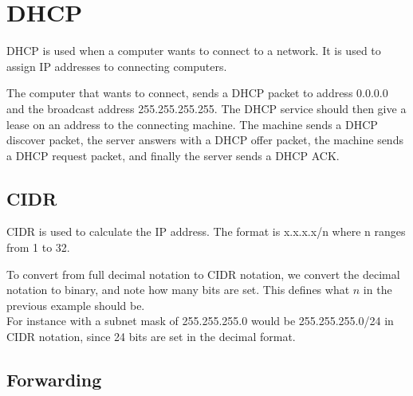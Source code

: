 \section{DHCP}
DHCP is used when a computer wants to connect to a network. It is used
to assign IP addresses to connecting computers.

The computer that wants to connect, sends a DHCP packet to address
0.0.0.0 and the broadcast address 255.255.255.255. The DHCP service
should then give a lease on an address to the connecting
machine. The machine sends a DHCP discover packet, the server answers
with a DHCP offer packet, the machine sends a DHCP request packet, and
finally the server sends a DHCP ACK.

\subsection{CIDR}
CIDR is used to calculate the IP address. The format is x.x.x.x/n
where n ranges from 1 to 32.

To convert from full decimal notation to CIDR notation, we convert the
decimal notation to binary, and note how many bits are set. This
defines what $n$ in the previous example should be.\\
For instance with a subnet mask of 255.255.255.0 would be
255.255.255.0/24 in CIDR notation, since 24 bits are set in the
decimal format.

\subsection{Forwarding}